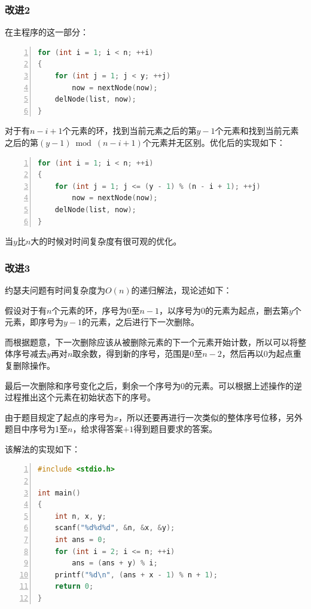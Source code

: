 \documentclass{article}
\begin{document}
\subsubsection{改进2}

在主程序的这一部分：

\begin{lstlisting}[language={C},
    numbers=left,
    numberstyle=\tiny\consolas,
    basicstyle=\small\consolas]
for (int i = 1; i < n; ++i)
{
    for (int j = 1; j < y; ++j)
        now = nextNode(now);
    delNode(list, now);
}
\end{lstlisting}

对于有$n-i+1$个元素的环，找到当前元素之后的第$y-1$个元素和找到当前元素之后的第$(y-1)\bmod (n-i+1)$个元素并无区别。优化后的实现如下：

\begin{lstlisting}[language={C},
    numbers=left,
    numberstyle=\tiny\consolas,
    basicstyle=\small\consolas]
for (int i = 1; i < n; ++i)
{
    for (int j = 1; j <= (y - 1) % (n - i + 1); ++j)
        now = nextNode(now);
    delNode(list, now);
}
\end{lstlisting}

当$y$比$n$大的时候对时间复杂度有很可观的优化。

\subsubsection{改进3}

约瑟夫问题有时间复杂度为$O(n)$的递归解法，现论述如下：

假设对于有$n$个元素的环，序号为0至$n-1$，以序号为0的元素为起点，删去第$y$个元素，即序号为$y-1$的元素，之后进行下一次删除。

而根据题意，下一次删除应该从被删除元素的下一个元素开始计数，所以可以将整体序号减去$y$再对$n$取余数，得到新的序号，范围是0至$n-2$，然后再以0为起点重复删除操作。

最后一次删除和序号变化之后，剩余一个序号为0的元素。可以根据上述操作的逆过程推出这个元素在初始状态下的序号。

由于题目规定了起点的序号为$x$，所以还要再进行一次类似的整体序号位移，另外题目中序号为1至$n$，给求得答案$+1$得到题目要求的答案。

该解法的实现如下：

\begin{lstlisting}[language={C},
    numbers=left,
    numberstyle=\tiny\consolas,
    basicstyle=\small\consolas]
#include <stdio.h>

int main()
{
    int n, x, y;
    scanf("%d%d%d", &n, &x, &y);
    int ans = 0;
    for (int i = 2; i <= n; ++i)
        ans = (ans + y) % i;
    printf("%d\n", (ans + x - 1) % n + 1);
    return 0;
}
\end{lstlisting}
\end{document}
